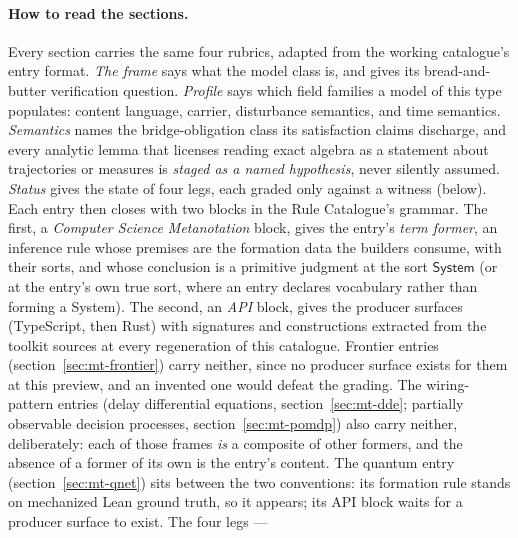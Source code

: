 \paragraph{How to read the sections.} Every section carries the same
four rubrics, adapted from the working catalogue's entry format.
\emph{The frame} says what the model class is, and gives its
bread-and-butter verification question. \emph{Profile} says which
field families a model of this type populates: content language,
carrier, disturbance semantics, and time semantics.
\emph{Semantics} names the bridge-obligation class its satisfaction
claims discharge, and every analytic lemma that licenses reading exact
algebra as a statement about trajectories or measures is
\emph{staged as a named hypothesis}, never silently assumed.
\emph{Status} gives the state of four legs, each graded only against a
witness (below). Each entry then closes with two blocks in the Rule
Catalogue's grammar. The first, a \emph{Computer Science Metanotation}
block, gives the entry's \emph{term former}, an inference rule whose
premises are the formation data the builders consume, with their
sorts, and whose conclusion is a primitive judgment at the sort
$\mathsf{System}$ (or at the entry's own true sort, where an entry
declares vocabulary rather than forming a System). The second, an
\emph{API} block, gives the producer surfaces (TypeScript, then Rust)
with signatures and constructions extracted from the toolkit sources
at every regeneration of this catalogue. Frontier entries
(section~\ref{sec:mt-frontier}) carry neither, since no producer
surface exists for them at this preview, and an invented one would
defeat the grading.  The wiring-pattern entries (delay differential
equations, section~\ref{sec:mt-dde}; partially observable decision
processes, section~\ref{sec:mt-pomdp}) also carry neither,
deliberately: each of those frames \emph{is} a composite of other
formers, and the absence of a former of its own is the entry's
content. The quantum entry (section~\ref{sec:mt-qnet})
sits between the two conventions: its formation rule stands on
mechanized Lean ground truth, so it appears; its API block waits for
a producer surface to exist. The four legs ---

